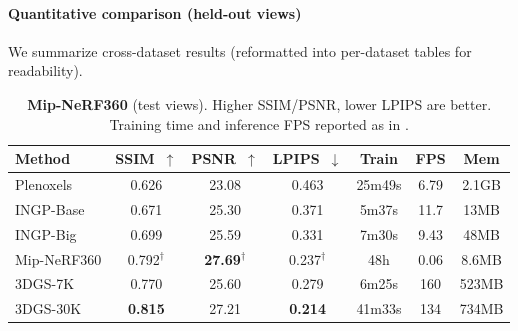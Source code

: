 \begin{enrichment}
\begin{enrichment}
\begin{enrichment}
        \paragraph{Quantitative comparison (held-out views)}
        We summarize cross-dataset results (reformatted into per-dataset tables for readability).
        
        \begin{table}[H]
            \centering\scriptsize
            \caption{\textbf{Mip-NeRF360} (test views). Higher SSIM/PSNR, lower LPIPS are better. Training time and inference FPS reported as in \cite{kerbl2023_3dgaussiansplatting}.}
            \label{tab:chapter23_mipnerf360}
            \setlength\tabcolsep{5pt}
            \begin{tabular}{lcccccc}
                \toprule
                Method & SSIM~$\uparrow$ & PSNR~$\uparrow$ & LPIPS~$\downarrow$ & Train & FPS & Mem \\
                \midrule
                Plenoxels & 0.626 & 23.08 & 0.463 & 25m49s & 6.79 & 2.1GB \\
                INGP-Base & 0.671 & 25.30 & 0.371 & 5m37s & 11.7 & 13MB \\
                INGP-Big  & 0.699 & 25.59 & 0.331 & 7m30s & 9.43 & 48MB \\
                Mip-NeRF360 & 0.792$^\dagger$ & \textbf{27.69}$^\dagger$ & 0.237$^\dagger$ & 48h & 0.06 & 8.6MB \\
                3DGS-7K   & 0.770 & 25.60 & 0.279 & 6m25s  & 160 & 523MB \\
                3DGS-30K  & \textbf{0.815} & 27.21 & \textbf{0.214} & 41m33s & 134 & 734MB \\
                \bottomrule
            \end{tabular}
        \end{table}
        

\end{enrichment}
\end{enrichment}
\end{enrichment}
